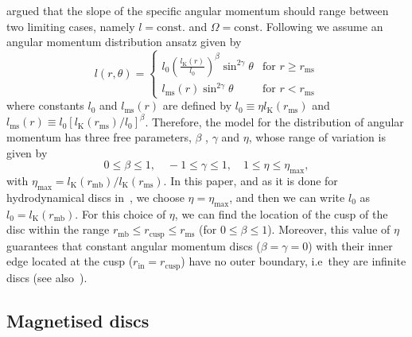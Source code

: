 \documentclass[referee]{aa}
\begin{document}
\cite{Jaroszynski:1980} argued that the slope of the specific angular momentum should range between two limiting cases, namely $l = \mathrm{const.}$ and $\Omega = \mathrm{const}$. Following \citet{Qian:2009} we assume an angular momentum distribution ansatz given by  
\begin{equation}
l (r,\theta) = \left\{ \label{eq:ansatz} 
  \begin{array}{lr}
    l_0 \left(\frac{l_{\mathrm{K}}(r)}{l_0}\right)^{\beta}\sin^{2\gamma}{\theta} &  \text{for } r \geq r_{\mathrm{ms}}\\
    l_{\mathrm{ms}}(r)\sin^{2\gamma}{\theta} & \text{for } r < r_{\mathrm{ms}}
  \end{array}
\right.
\end{equation}
where constants $l_0$ and $l_{\mathrm{ms}}(r)$ are defined by $l_0 \equiv \eta l_{\mathrm{K}}(r_{\mathrm{ms}})$ and $l_{\mathrm{ms}}(r) \equiv l_0 [l_{\mathrm{K}}(r_{\mathrm{ms}})/l_0]^{\beta}$. Therefore, the model for the distribution of angular momentum has three free parameters, $\beta$ , $\gamma$ and $\eta$, whose range of variation is given by~\citep{Qian:2009}
\begin{equation}
0 \leq \beta \leq 1, \quad -1 \leq \gamma \leq 1, \quad 1 \leq \eta \leq \eta_{\mathrm{max}},
\end{equation}
with $\eta_{\mathrm{max}} = l_{\mathrm{K}}(r_{\mathrm{mb}})/l_{\mathrm{K}}(r_{\mathrm{ms}})$. In this paper, and as it is done for hydrodynamical discs in~\citet{Qian:2009}, we choose $\eta = \eta_{\mathrm{max}}$, and then we can write $l_0$ as $l_0 = l_{\mathrm{K}}(r_{\mathrm{mb}})$. For this choice of $\eta$, we can find the location of the cusp of the disc  within the range $r_{\mathrm{mb}} \leq r_{\mathrm{cusp}} \leq r_{\mathrm{ms}}$ (for $0 \leq \beta \leq 1$). Moreover, this value of $\eta$ guarantees that constant angular momentum discs ($\beta = \gamma = 0$) with their inner edge located at the cusp ($r_{\mathrm{in}} = r_{\mathrm{cusp}}$) have no outer boundary, i.e~they are infinite discs (see also~\cite{Font:2002}). 

\subsection{Magnetised discs}
\end{document}
